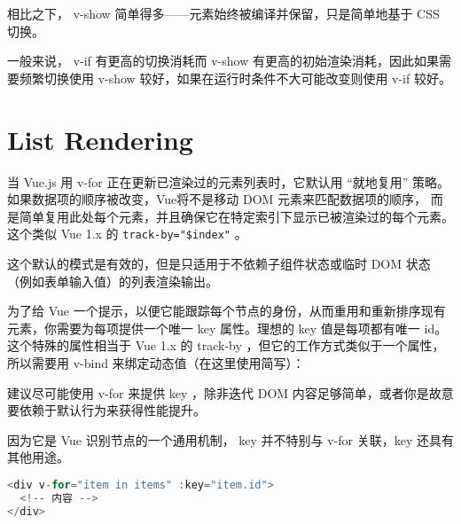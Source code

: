 相比之下， v-show 简单得多——元素始终被编译并保留，只是简单地基于 CSS 切换。

一般来说， v-if 有更高的切换消耗而 v-show 有更高的初始渲染消耗，因此如果需要频繁切换使用 v-show 较好，如果在运行时条件不大可能改变则使用 v-if 较好。


\section{List Rendering}


当 Vue.js 用 v-for 正在更新已渲染过的元素列表时，它默认用 “就地复用” 策略。如果数据项的顺序被改变，Vue将不是移动 DOM 元素来匹配数据项的顺序， 而是简单复用此处每个元素，并且确保它在特定索引下显示已被渲染过的每个元素。这个类似 Vue 1.x 的 \texttt{track-by="\$index"} 。

这个默认的模式是有效的，但是只适用于不依赖子组件状态或临时 DOM 状态（例如表单输入值）的列表渲染输出。

为了给 Vue 一个提示，以便它能跟踪每个节点的身份，从而重用和重新排序现有元素，你需要为每项提供一个唯一 key 属性。理想的 key 值是每项都有唯一 id。这个特殊的属性相当于 Vue 1.x 的 track-by ，但它的工作方式类似于一个属性，所以需要用 v-bind 来绑定动态值（在这里使用简写）：

建议尽可能使用 v-for 来提供 key ，除非迭代 DOM 内容足够简单，或者你是故意要依赖于默认行为来获得性能提升。


因为它是 Vue 识别节点的一个通用机制， key 并不特别与 v-for 关联，key 还具有其他用途。

\begin{lstlisting}[language=JavaScript]
<div v-for="item in items" :key="item.id">
  <!-- 内容 -->
</div>
\end{lstlisting}



\begin{lstlisting}[language=JavaScript]

\end{lstlisting}




\begin{lstlisting}[language=JavaScript]

\end{lstlisting}



\begin{lstlisting}[language=JavaScript]

\end{lstlisting}



